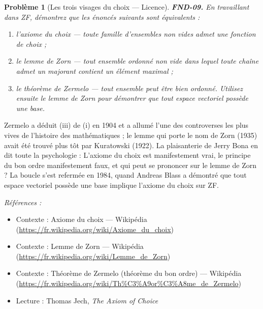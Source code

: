 \documentclass[11pt]{article}
\newtheorem{problem}{Problème}
\newenvironment{refs}{\par\small\noindent\emph{Références :}\begin{itemize}\setlength\itemsep{0pt}}{\end{itemize}\normalsize}
\begin{document}
\begin{problem}[{Les trois visages du choix --- Licence}]
\textbf{FND-09.} En travaillant dans ZF, démontrez que les énoncés suivants sont équivalents :
\begin{enumerate}
\item[(i)] l'\textit{axiome du choix} --- toute famille d'ensembles non vides admet une fonction de choix ;
\item[(ii)] le \textit{lemme de Zorn} --- tout ensemble ordonné non vide dans lequel toute chaîne admet un
majorant contient un élément maximal ;
\item[(iii)] le \textit{théorème de Zermelo} --- tout ensemble peut
être bien ordonné. Utilisez ensuite le lemme de Zorn pour démontrer que tout espace vectoriel
possède une base.
\end{enumerate}

\end{problem}

\noindent Zermelo a déduit (iii) de (i) en 1904 et a allumé l'une des controverses les
plus vives de l'histoire des mathématiques ; le lemme qui porte le nom de Zorn (1935) avait été
trouvé plus tôt par Kuratowski (1922). La plaisanterie de Jerry Bona en dit toute la psychologie :
\og{} L'axiome du choix est manifestement vrai, le principe du bon ordre manifestement faux, et qui
peut se prononcer sur le lemme de Zorn ? \fg{} La boucle s'est refermée en 1984, quand Andreas Blass a
démontré que \og{} tout espace vectoriel possède une base \fg{} implique l'axiome du choix sur ZF.

\begin{refs}
\item Contexte : Axiome du choix --- Wikipédia (\url{https://fr.wikipedia.org/wiki/Axiome_du_choix})
\item Contexte : Lemme de Zorn --- Wikipédia (\url{https://fr.wikipedia.org/wiki/Lemme_de_Zorn})
\item Contexte : Théorème de Zermelo (théorème du bon ordre) --- Wikipédia (\url{https://fr.wikipedia.org/wiki/Th%C3%A9or%C3%A8me_de_Zermelo})
\item Lecture : Thomas Jech, \textit{The Axiom of Choice}
\end{refs}

\bigskip
\end{document}
